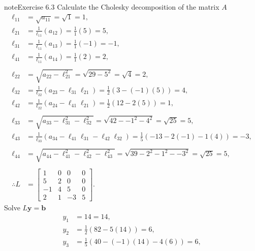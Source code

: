 \documentclass[letterpaper,10pt,english]{jupyterBook}
\begin{document}
\begin{sphinxadmonition}{note}{Exercise 6.3}
\sphinxAtStartPar
Calculate the Cholesky decomposition of the matrix \(A\)
\begin{align*}
    \ell_{11} &= \sqrt{ a_{11} } = \sqrt{ 1 } = 1, \\
    \ell_{21} &= \frac{1}{\ell_{11}} \left( a_{12} \right) = \frac{1}{1} \left( 5 \right) = 5, \\
    \ell_{31} &= \frac{1}{\ell_{11}} \left( a_{13} \right) = \frac{1}{1} \left( -1 \right) = -1, \\
    \ell_{41} &= \frac{1}{\ell_{11}} \left( a_{14} \right) = \frac{1}{1} \left( 2 \right) = 2, \\
    \\
    \ell_{22} &= \sqrt{ a_{22} - \ell_{21}^2 } = \sqrt{ 29 - 5^2 } = \sqrt{ 4 } = 2, \\
    \ell_{32} &= \frac{1}{\ell_{22}} \left( a_{23} - \ell_{31} \ell_{21} \right) = \frac{1}{2} \left( 3 - \left( -1 \right) \left( 5 \right) \right) = 4, \\
    \ell_{42} &= \frac{1}{\ell_{22}} \left( a_{24} - \ell_{41} \ell_{21} \right) = \frac{1}{2} \left( 12 - 2 \left( 5 \right) \right) = 1, \\
    \\
    \ell_{33} &= \sqrt{ a_{33} - \ell_{31}^2 - \ell_{32}^2 } = \sqrt{ 42 - -1^2 - 4^2 } = \sqrt{ 25 } = 5, \\
    \ell_{43} &= \frac{1}{\ell_{33}} \left( a_{34} - \ell_{41} \ell_{31} - \ell_{42} \ell_{32} \right) = \frac{1}{5} \left( -13 - 2 \left( -1 \right) - 1 \left( 4 \right) \right) = -3, \\
    \\
    \ell_{44} &= \sqrt{ a_{44} - \ell_{41}^2 - \ell_{42}^2 - \ell_{43}^2 } = \sqrt{ 39 - 2^2 - 1^2 - -3^2 } = \sqrt{ 25 } = 5, \\
    \\
    \therefore L &= \left[\begin{matrix}1 & 0 & 0 & 0\\5 & 2 & 0 & 0\\-1 & 4 & 5 & 0\\2 & 1 & -3 & 5\end{matrix}\right].
\end{align*}
\sphinxAtStartPar
Solve \(L \mathbf{y} = \mathbf{b}\)
\begin{align*}
    y_{1} &= 14 = 14, \\
    y_{2} &= \frac{1}{2} \left( 82 - 5 \left( 14 \right)\right) = 6, \\
    y_{3} &= \frac{1}{5} \left( 40 - \left( -1 \right) \left( 14 \right) - 4 \left( 6 \right)\right) = 6, \\

\end{align*}
\end{sphinxadmonition}
\end{document}
